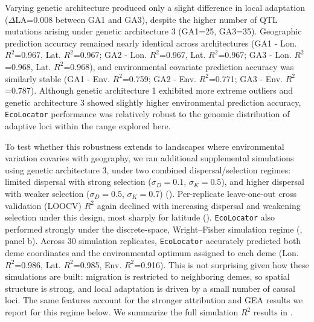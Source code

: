 \documentclass[]{article}
\newcommand{\ecolocator}{\texttt{EcoLocator}\xspace}
\begin{document}
Varying genetic architecture produced only a slight difference in local adaptation
(${\Delta}$LA=0.008 between GA1 and GA3),
despite the higher number of QTL mutations arising
under genetic architecture 3 (GA1=25, GA3=35).
Geographic prediction accuracy remained nearly identical across architectures
(GA1 - Lon. $R^2$=0.967, Lat. $R^2$=0.967; 
GA2 - Lon. $R^2$=0.967, Lat. $R^2$=0.967; 
GA3 - Lon. $R^2$=0.968, Lat. $R^2$=0.968),
and environmental covariate prediction accuracy was similarly stable 
(GA1 - Env. $R^2$=0.759; 
GA2 - Env. $R^2$=0.771; 
GA3 - Env. $R^2$=0.787).
Although genetic architecture 1 
exhibited more extreme outliers and genetic architecture 3 showed slightly higher environmental prediction accuracy,
\ecolocator performance was relatively robust 
to the genomic distribution of adaptive loci within the range explored here. 

To test whether this robustness extends to landscapes where environmental 
variation covaries with geography, we ran additional supplemental simulations 
using genetic architecture 3, under two combined dispersal/selection 
regimes: limited dispersal with strong selection 
($\sigma_D=0.1$, $\sigma_K=0.5$), and higher dispersal with 
weaker selection ($\sigma_D=0.5$, $\sigma_K=0.7$) (). 
Per-replicate leave-one-out cross validation (LOOCV) $R^2$ 
again declined with 
increasing dispersal and weakening selection under this design, 
most sharply for latitude ().
\ecolocator also performed strongly under the discrete-space,
Wright--Fisher simulation regime (, panel b).
Across 30 simulation replicates,
\ecolocator accurately predicted both deme coordinates
and the environmental optimum assigned to each deme
(Lon. $R^2$=0.986,
Lat. $R^2$=0.985,
Env. $R^2$=0.916).
This is not surprising given how these simulations are built:
migration is restricted to neighboring demes,
so spatial structure is strong,
and local adaptation is driven by a small number of causal loci.
The same features account for the stronger attribution
and GEA results we report for this regime below.
We summarize the full simulation $R^2$ results in .
\end{document}
